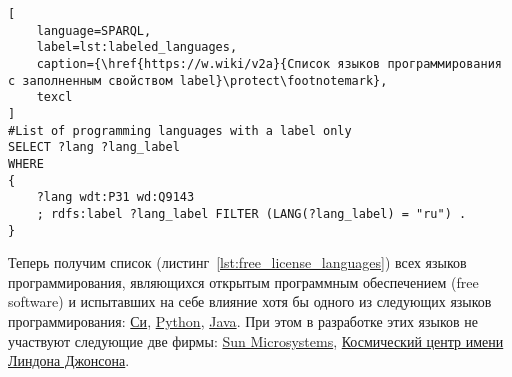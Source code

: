 \label{question:prog_lang_1}

\begin{lstlisting}[
	language=SPARQL,
	label=lst:labeled_languages,
	caption={\href{https://w.wiki/v2a}{Список языков программирования с заполненным свойством label}\protect\footnotemark},
	texcl
]
#List of programming languages with a label only
SELECT ?lang ?lang_label
WHERE
{
    ?lang wdt:P31 wd:Q9143
    ; rdfs:label ?lang_label FILTER (LANG(?lang_label) = "ru") . 
}
\end{lstlisting}

Теперь получим список (листинг~\ref{lst:free_license_languages}) всех языков программирования, являющихся открытым программным обеспечением (free software) и испытавших на себе влияние хотя бы одного из следующих языков программирования: \href{https://en.wikipedia.org/wiki/C_(programming_language)}{Си}, \href{https://ru.wikipedia.org/wiki/Python}{Python}, \href{https://ru.wikipedia.org/wiki/Java}{Java}. При этом в разработке этих языков не участвуют следующие две фирмы: \href{https://ru.wikipedia.org/wiki/Sun_Microsystems}{Sun Microsystems}, \href{https://en.wikipedia.org/wiki/Johnson_Space_Center}{Космический центр имени Линдона Джонсона}.

